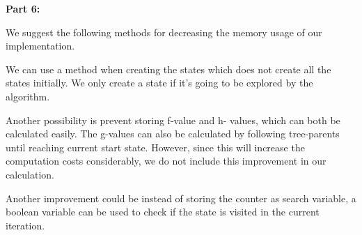\documentclass[12pt]{amsart}
\begin{document}
\noindent \textbf{Part  6:}

We suggest the following methods for decreasing the memory usage of our implementation. 

We can use a method when creating the states which does not  create all the states initially. We only create a state if it's going to be explored by the algorithm.

Another possibility is prevent storing f-value and h- values, which can both be calculated easily. The g-values can also be calculated by following tree-parents until reaching current start state. However, since this will increase the computation costs considerably, we do not include this improvement in our calculation. 

 Another improvement could be instead of storing the counter as search variable, a boolean variable can be used to check if the state is visited in the current iteration.
 
 
\end{document}
